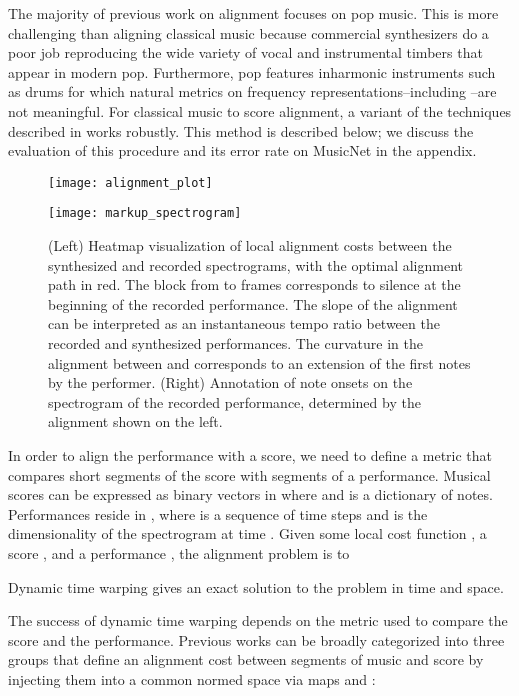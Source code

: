 \documentclass{article} \usepackage{iclr2017_conference,times}
\begin{document}
The majority of previous work on alignment focuses on pop music. This is more challenging than aligning classical music because commercial synthesizers do a poor job reproducing the wide variety of vocal and instrumental timbers that appear in modern pop. Furthermore, pop features inharmonic instruments such as drums for which natural metrics on frequency representations--including --are not meaningful. For classical music to score alignment, a variant of the techniques described in \cite{turetsky} works robustly. This method is described below; we discuss the evaluation of this procedure and its error rate on MusicNet in the appendix.

\begin{figure}[h]
  \label{alignment}
  \centering
  
  \begin{minipage}{.5\textwidth}
  \texttt{[image: alignment\_plot]}
\end{minipage}\begin{minipage}{.5\textwidth}
  \texttt{[image: markup\_spectrogram]}
\end{minipage}

  \caption{(Left) Heatmap visualization of local alignment costs between the synthesized and recorded spectrograms, with the optimal alignment path in red. The block from  to  frames corresponds to silence at the beginning of the recorded performance. The slope of the alignment can be interpreted as an instantaneous tempo ratio between the recorded and synthesized performances. The curvature in the alignment between  and  corresponds to an extension of the first notes by the performer. (Right) Annotation of note onsets on the spectrogram of the recorded performance, determined by the alignment shown on the left.}
\end{figure}

In order to align the performance with a score, we need to define a metric that compares short segments of the score with segments of a performance. Musical scores can be expressed as binary vectors in  where  and  is a dictionary of notes. Performances reside in , where  is a sequence of time steps and  is the dimensionality of the spectrogram at time . Given some local cost function , a score , and a performance , the alignment problem is to

Dynamic time warping gives an exact solution to the problem in  time and space.

The success of dynamic time warping depends on the metric used to compare the score and the performance. Previous works can be broadly categorized into three groups that define an alignment cost  between segments of music  and score  by injecting them into a common normed space via maps  and :
\end{document}
